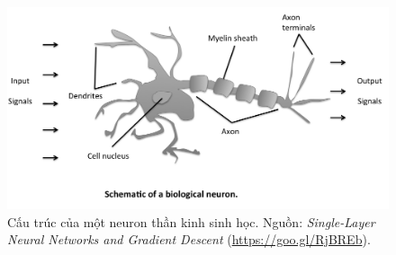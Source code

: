 \begin{figure}[t]
\centering
\includegraphics[width = \textwidth]{Chapters/05_NeuralNetworks/09_perceptron/perceptron_neuron_gray.png}
\caption{
Cấu trúc của một neuron thần kinh sinh học. Nguồn: \textit{Single-Layer Neural Networks and Gradient Descent} (\url{https://goo.gl/RjBREb}).
}
\label{fig:9_per_nn}
\end{figure}





